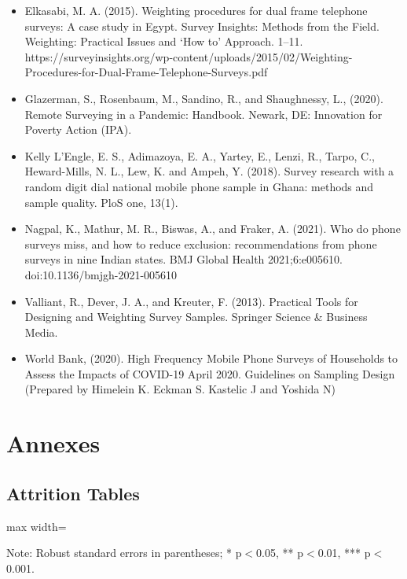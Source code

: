 \documentclass[11pt,harvard]{article}
\begin{document}
\begin{itemize}[left=2.75em]
	\item Elkasabi, M. A. (2015). Weighting procedures for dual frame telephone surveys: A case study in Egypt. Survey Insights: Methods from the Field. Weighting: Practical Issues and ‘How to’ Approach. 1–11. https://surveyinsights.org/wp-content/uploads/2015/02/Weighting-Procedures-for-Dual-Frame-Telephone-Surveys.pdf
	
	\item Glazerman, S., Rosenbaum, M., Sandino, R., and Shaughnessy, L., (2020). Remote Surveying in a Pandemic: Handbook. Newark, DE: Innovation for Poverty Action (IPA).
	
	\item Kelly L’Engle, E. S., Adimazoya, E. A., Yartey, E., Lenzi, R., Tarpo, C., Heward-Mills, N. L., Lew, K. and Ampeh, Y. (2018). Survey research with a random digit dial national mobile phone sample in Ghana: methods and sample quality. PloS one, 13(1).
	
	\item	Nagpal, K., Mathur, M. R., Biswas, A., and Fraker, A. (2021). Who do phone surveys miss, and how to reduce exclusion: recommendations from phone surveys in nine Indian states. BMJ Global Health 2021;6:e005610. doi:10.1136/bmjgh-2021-005610
	
	\item	Valliant, R., Dever, J. A., and Kreuter, F. (2013). Practical Tools for Designing and Weighting Survey Samples. Springer Science \& Business Media.
	
	\item	World Bank, (2020). High Frequency Mobile Phone Surveys of Households to Assess the Impacts of COVID-19 April 2020. Guidelines on Sampling Design (Prepared by Himelein K. Eckman S. Kastelic J and Yoshida N)
\end{itemize}

\pagebreak
\section{Annexes}
\subsection{Attrition Tables}
\begin{table}[htbp]
		\centering
		\begin{adjustbox}{max width=\textwidth}
			\begin{threeparttable}
				\caption{Myanmar Sample Balance Table}
				\scriptsize
				\label{tab:Myanmar_Modality_Demo_Balance}
				\begin{tablenotes}
					\item Note: Robust standard errors in parentheses; * p$<$0.05, ** p$<$0.01, *** p$<$0.001. 
				\end{tablenotes}
			\end{threeparttable}
		\end{adjustbox}
\end{table}
	
\end{document}
